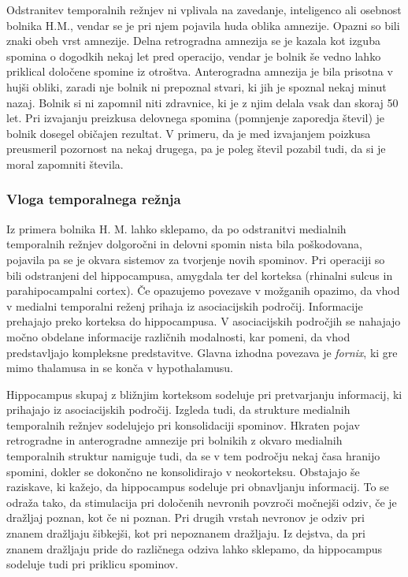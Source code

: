 \documentclass[10pt,a4paper]{article}
\begin{document}
Odstranitev temporalnih režnjev ni vplivala na zavedanje, inteligenco ali osebnost bolnika H.M., vendar se je pri njem pojavila huda oblika amnezije. Opazni so bili znaki obeh vrst amnezije. Delna retrogradna amnezija se je kazala kot izguba spomina o dogodkih nekaj let pred operacijo, vendar je bolnik še vedno lahko priklical določene spomine iz otroštva. Anterogradna amnezija je bila prisotna v hujši obliki, zaradi nje bolnik ni prepoznal stvari, ki jih je spoznal nekaj minut nazaj. Bolnik si ni zapomnil niti zdravnice, ki je z njim delala vsak dan skoraj 50 let. Pri izvajanju preizkusa delovnega spomina (pomnjenje zaporedja števil) je bolnik dosegel običajen rezultat. V primeru, da je med izvajanjem poizkusa preusmeril pozornost na nekaj drugega, pa je poleg števil pozabil tudi, da si je moral zapomniti števila.

\subsubsection{Vloga temporalnega režnja}
Iz primera bolnika H. M. lahko sklepamo, da po odstranitvi medialnih temporalnih režnjev dolgoročni in delovni spomin nista bila poškodovana, pojavila pa se je okvara sistemov za tvorjenje novih spominov. Pri operaciji so bili odstranjeni del hippocampusa, amygdala ter del korteksa (rhinalni sulcus in parahipocampalni cortex). Če opazujemo povezave v možganih opazimo, da vhod v medialni temporalni reženj prihaja iz asociacijskih področij. Informacije prehajajo preko korteksa do hippocampusa. V asociacijskih področjih se nahajajo močno obdelane informacije različnih modalnosti, kar pomeni, da vhod predstavljajo kompleksne predstavitve. Glavna izhodna povezava je {\it fornix}, ki gre mimo thalamusa in se konča v hypothalamusu.

Hippocampus skupaj z bližnjim korteksom sodeluje pri pretvarjanju informacij, ki prihajajo iz asociacijskih področij. Izgleda tudi, da strukture medialnih temporalnih režnjev sodelujejo pri konsolidaciji spominov. Hkraten pojav retrogradne in anterogradne amnezije pri bolnikih z okvaro medialnih temporalnih struktur namiguje tudi, da se v tem področju nekaj časa hranijo spomini, dokler se dokončno ne konsolidirajo v neokorteksu. Obstajajo še raziskave, ki kažejo, da hippocampus sodeluje pri obnavljanju informacij. To se odraža tako, da stimulacija pri določenih nevronih povzroči močnejši odziv, če je dražljaj poznan, kot če ni poznan. Pri drugih vrstah nevronov je odziv pri znanem dražljaju šibkejši, kot pri nepoznanem dražljaju. Iz dejstva, da pri znanem dražljaju pride do različnega odziva lahko sklepamo, da hippocampus sodeluje tudi pri priklicu spominov.
\end{document}
